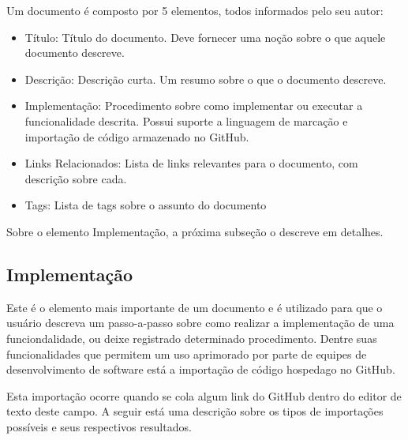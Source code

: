 Um documento é composto por 5 elementos, todos informados pelo seu autor:

\begin{itemize}
  \item Título: Título do documento. Deve fornecer uma noção sobre o que aquele documento descreve.
  \item Descrição: Descrição curta. Um resumo sobre o que o documento descreve.
  \item Implementação: Procedimento sobre como implementar ou executar a funcionalidade descrita. Possui suporte a linguagem de marcação e importação de código armazenado no GitHub.
  \item Links Relacionados: Lista de links relevantes para o documento, com descrição sobre cada.
  \item Tags: Lista de tags sobre o assunto do documento
\end{itemize}

Sobre o elemento Implementação, a próxima subseção o descreve em detalhes.

\subsection{Implementação}

Este é o elemento mais importante de um documento e é utilizado para que o usuário descreva um passo-a-passo sobre
como realizar a implementação de uma funciondalidade, ou deixe registrado determinado procedimento. Dentre suas funcionalidades que permitem um uso aprimorado por parte de equipes de desenvolvimento de software está a importação de código hospedago no GitHub.

Esta importação ocorre quando se cola algum link do GitHub dentro do editor de texto deste campo. A seguir está uma descrição sobre os tipos de importações possíveis e seus respectivos resultados.

